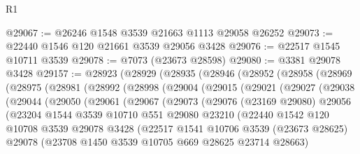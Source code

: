 \begin{lexlean}{R1}
\begin{coremodule}
@29067 := @26246 @1548 @3539 @21663 @1113 @29058 @26252
@29073 := @22440 @1546 @120 @21661 @3539 @29056 @3428
@29076 := @22517 @1545 @10711 @3539
@29078 := @7073 (@23673 @28598)
@29080 := @3381 @29078 @3428
@29157 := @28923
    (@28929
      (@28935
        (@28946
          (@28952
            (@28958
              (@28969
                (@28975
                  (@28981
                    (@28992
                      (@28998
                        (@29004
                          (@29015
                            (@29021
                              (@29027
                                (@29038
                                  (@29044
                                    (@29050
                                      (@29061
                                        (@29067
                                          (@29073
                                            (@29076
                                              (@23169 @29080)
                                              @29056
                                              (@23204
                                                @1544
                                                @3539
                                                @10710
                                                @551
                                                @29080
                                                @23210
                                                (@22440
                                                  @1542
                                                  @120
                                                  @10708
                                                  @3539
                                                  @29078
                                                  @3428
                                                  (@22517
                                                    @1541
                                                    @10706
                                                    @3539
                                                    (@23673 @28625)
                                                    @29078
                                                    (@23708
                                                      @1450
                                                      @3539
                                                      @10705
                                                      @669
                                                      @28625
                                                      @23714
                                                      @28663)

\end{coremodule}
\end{lexlean}
